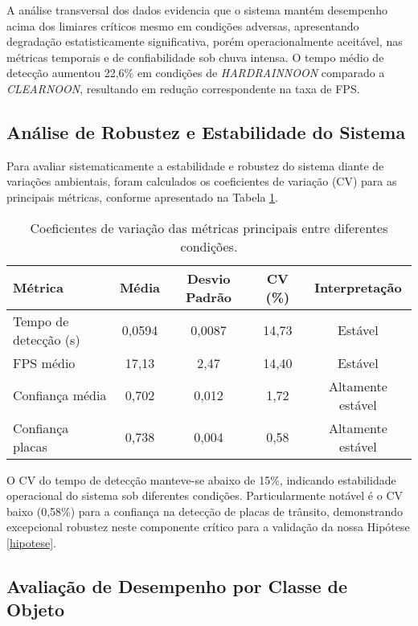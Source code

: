 A análise transversal dos dados evidencia que o sistema mantém desempenho acima dos limiares críticos mesmo em condições adversas, apresentando degradação estatisticamente significativa, porém operacionalmente aceitável, nas métricas temporais e de confiabilidade sob chuva intensa. O tempo médio de detecção aumentou 22,6\% em condições de \textit{HARDRAINNOON} comparado a \textit{CLEARNOON}, resultando em redução correspondente na taxa de FPS.

\subsection{Análise de Robustez e Estabilidade do Sistema}

Para avaliar sistematicamente a estabilidade e robustez do sistema diante de variações ambientais, foram calculados os coeficientes de variação (CV) para as principais métricas, conforme apresentado na Tabela \ref{tab:coef_variacao}.

\begin{table}[H]
\centering
\renewcommand{\arraystretch}{1.3}
\begin{tabular}{|l|c|c|c|c|}
\hline
\textbf{Métrica} & \textbf{Média} & \textbf{Desvio Padrão} & \textbf{CV (\%)} & \textbf{Interpretação} \\
\hline
Tempo de detecção (s) & 0,0594 & 0,0087 & 14,73 & Estável \\
\hline
FPS médio & 17,13 & 2,47 & 14,40 & Estável \\
\hline
Confiança média & 0,702 & 0,012 & 1,72 & Altamente estável \\
\hline
Confiança placas & 0,738 & 0,004 & 0,58 & Altamente estável \\
\hline
\end{tabular}
\caption{Coeficientes de variação das métricas principais entre diferentes condições.}
\label{tab:coef_variacao}
\end{table}

O CV do tempo de detecção manteve-se abaixo de 15\%, indicando estabilidade operacional do sistema sob diferentes condições. Particularmente notável é o CV baixo (0,58\%) para a confiança na detecção de placas de trânsito, demonstrando excepcional robustez neste componente crítico para a validação da nossa Hipótese \ref{hipotese}.

\subsection{Avaliação de Desempenho por Classe de Objeto}

